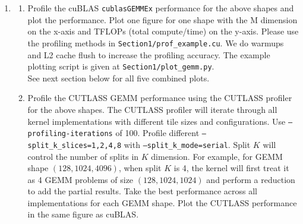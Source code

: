\documentclass[12pt]{article}
\begin{document}
\begin{enumerate}[label=\textbf{Q\arabic*.}]
\begin{enumerate}
        \item What is \href{https://github.com/NVIDIA/cutlass}{CUTLASS}? What is \href{https://docs.nvidia.com/cuda/cublas/}{cuBLAS}? What is the key difference between them? \\

        CUTLASS and cuBLAS are both libraries for high-performance GEMM and deep learning operations. CUTLASS is an open-source C++ template library built on top of CUDA emphasizing customization. It provides specialized building blocks to can be assembled together into efficient kernels with expert knowledge. On the other hand, cuBLAS is a proprietary, pre-compiled library that is intended for off-the-shelf use.


    \end{enumerate}

    \item 
    \begin{enumerate}
        \item Profile the cuBLAS \texttt{cublasGEMMEx} performance for the above shapes and plot the performance. Plot one figure for one shape with the M dimension on the x-axis and TFLOPs (total compute/time) on the y-axis. Please use the profiling methods in \texttt{Section1/prof\_example.cu}. We do warmups and L2 cache flush to increase the profiling accuracy. The example plotting script is given at \texttt{Section1/plot\_gemm.py}. \\
        
        See next section below for all five combined plots. \\
        
        
        \item Profile the CUTLASS GEMM performance using the CUTLASS profiler for the above shapes. The CUTLASS profiler will iterate through all kernel implementations with different tile sizes and configurations. Use \texttt{--profiling-iterations} of 100. Profile different \texttt{--split\_k\_slices=1,2,4,8} with \texttt{--split\_k\_mode=serial}. Split $K$ will control the number of splits in $K$ dimension. For example, for GEMM shape $(128, 1024, 4096)$, when split $K$ is 4, the kernel will first treat it as 4 GEMM problems of size $(128, 1024, 1024)$ and perform a reduction to add the partial results. Take the best performance across all implementations for each GEMM shape. Plot the CUTLASS performance in the same figure as cuBLAS. \\


\end{enumerate}
\end{enumerate}
\end{document}
